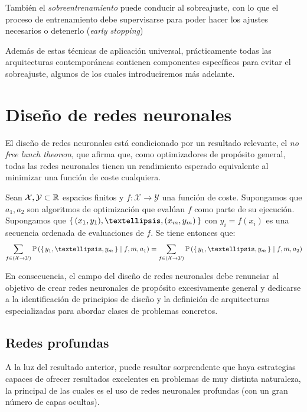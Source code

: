 También el \textit{sobreentrenamiento} puede conducir al sobreajuste, con lo que el proceso de entrenamiento debe supervisarse para poder hacer los ajustes necesarios o detenerlo (\textit{early stopping}) 

Además de estas técnicas de aplicación universal, prácticamente todas las arquitecturas contemporáneas contienen componentes específicos para evitar el sobreajuste, algunos de los cuales introduciremos más adelante.

\section{Diseño de redes neuronales}
El diseño de redes neuronales está condicionado por un resultado relevante, el \textit{no free lunch theorem}, que afirma que, como optimizadores de propósito general, todas las redes neuronales tienen un rendimiento esperado equivalente al minimizar una función de coste cualquiera.
\begin{theorem}
    Sean \( \mathcal{X}, \mathcal{Y} \subset \mathbb{R} \) espacios finitos y \( f \colon \mathcal{X} \to \mathcal{Y} \) una función de coste. Supongamos que \( a_1, a_2 \) son algoritmos de optimización que evalúan \( f \) como parte de su ejecución. Supongamos que \( \Set{ (x_{1}, y_{1}), …, (x_{m}, y_{m}) } \) con \( y_{i} = f(x_{i}) \) es una secuencia ordenada de evaluaciones de \( f \). Se tiene entonces que:
    \[
        \sum_{f \in (\mathcal{X} \to \mathcal{Y})} \mathbb{P} \left( \Set{y_{1}, …, y_{m}} \mid f, m, a_1 \right) = \sum_{f \in (\mathcal{X} \to \mathcal{Y})} \mathbb{P} \left( \Set{y_{1}, …, y_{m}} \mid f, m, a_2 \right)
    \]
\end{theorem}

En consecuencia, el campo del diseño de redes neuronales debe renunciar al objetivo de crear redes neuronales de propósito excesivamente general y dedicarse a la identificación de principios de diseño y la definición de arquitecturas especializadas para abordar clases de problemas concretos. 

\subsection{Redes profundas}
A la luz del resultado anterior, puede resultar sorprendente que haya estrategias capaces de ofrecer resultados excelentes en problemas de muy distinta naturaleza, la principal de las cuales es el uso de redes neuronales profundas (con un gran número de capas ocultas).

